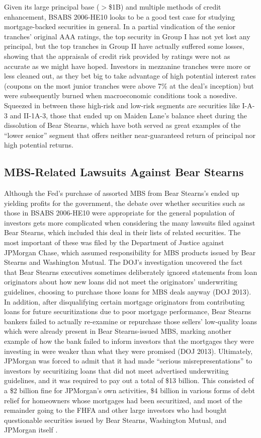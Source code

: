 \documentclass[12pt]{article}
\begin{document}
Given its large principal base ($>$\$1B) and multiple methods of credit enhancement, BSABS 2006-HE10 looks to be a good test case for studying mortgage-backed securities in general. In a partial vindication of the senior tranches’ original AAA ratings, the top security in Group I has not yet lost any principal, but the top tranches in Group II have actually suffered some losses, showing that the appraisals of credit risk provided by ratings were not as accurate as we might have hoped. Investors in mezzanine tranches were more or less cleaned out, as they bet big to take advantage of high potential interest rates (coupons on the most junior tranches were above 7\% at the deal’s inception) but were subsequently burned when macroeconomic conditions took a nosedive. Squeezed in between these high-risk and low-risk segments are securities like I-A-3 and II-1A-3, those that ended up on Maiden Lane’s balance sheet during the dissolution of Bear Stearns, which have both served as great examples of the “lower senior” segment that offers neither near-guaranteed return of principal nor high potential returns.

\subsection*{MBS-Related Lawsuits Against Bear Stearns}

Although the Fed’s purchase of assorted MBS from Bear Stearns’s ended up yielding profits for the government, the debate over whether securities such as those in BSABS 2006-HE10 were appropriate for the general population of investors gets more complicated when considering the many lawsuits filed against Bear Stearns, which included this deal in their lists of related securities. The most important of these was filed by the Department of Justice against JPMorgan Chase, which assumed responsibility for MBS products issued by Bear Stearns and Washington Mutual. The DOJ’s investigation uncovered the fact that Bear Stearns executives sometimes deliberately ignored statements from loan originators about how new loans did not meet the originators’ underwriting guidelines, choosing to purchase those loans for MBS deals anyway (DOJ 2013). In addition, after disqualifying certain mortgage originators from contributing loans for future securitizations due to poor mortgage performance, Bear Stearns bankers failed to actually re-examine or repurchase those sellers’ low-quality loans which were already present in Bear Stearns-issued MBS, marking another example of how the bank failed to inform investors that the mortgages they were investing in were weaker than what they were promised (DOJ 2013). Ultimately, JPMorgan was forced to admit that it had made “serious misrepresentations” to investors by securitizing loans that did not meet advertised underwriting guidelines, and it was required to pay out a total of \$13 billion. This consisted of a \$2 billion fine for JPMorgan’s own activities, \$4 billion in various forms of debt relief for homeowners whose mortgages had been securitized, and most of the remainder going to the FHFA and other large investors who had bought questionable securities issued by Bear Stearns, Washington Mutual, and JPMorgan itself \parencite{eavis13}. 
\end{document}

